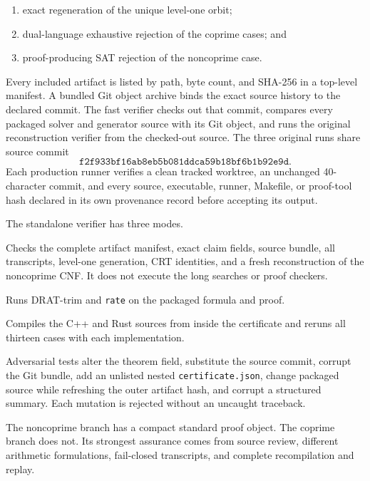\documentclass[11pt]{article}
\begin{document}
\begin{enumerate}[leftmargin=2.2em]
  \item exact regeneration of the unique level-one orbit;
  \item dual-language exhaustive rejection of the coprime cases; and
  \item proof-producing SAT rejection of the noncoprime case.
\end{enumerate}

Every included artifact is listed by path, byte count, and SHA-256 in a
top-level manifest.  A bundled Git object archive binds the exact source
history to the declared commit.  The fast verifier checks out that commit,
compares every packaged solver and generator source with its Git object, and
runs the original reconstruction verifier from the checked-out source.  The
three original runs share source commit
\[
\texttt{f2f933bf16ab8eb5b081ddca59b18bf6b1b92e9d}.
\]
Each production runner verifies a clean tracked worktree, an unchanged
40-character commit, and every source, executable, runner, Makefile, or
proof-tool hash declared in its own provenance record before accepting its
output.

The standalone verifier has three modes.

\begin{description}[leftmargin=2.8em,style=nextline]
  \item[Fast integrity and reconstruction]
    Checks the complete artifact manifest, exact claim fields, source
    bundle, all transcripts, level-one generation, CRT identities, and a
    fresh reconstruction of the noncoprime CNF.  It does not execute the
    long searches or proof checkers.
  \item[DRAT replay]
    Runs DRAT-trim and \texttt{rate} on the packaged formula and proof.
  \item[Full coprime replay]
    Compiles the C++ and Rust sources from inside the certificate and reruns
    all thirteen cases with each implementation.
\end{description}

Adversarial tests alter the theorem field, substitute the source commit,
corrupt the Git bundle, add an unlisted nested \texttt{certificate.json},
change packaged source while refreshing the outer artifact hash, and corrupt
a structured summary.  Each mutation is rejected without an uncaught
traceback.

The noncoprime branch has a compact standard proof object.  The coprime
branch does not.  Its strongest assurance comes from source review,
different arithmetic formulations, fail-closed transcripts, and complete
recompilation and replay.
\end{document}
